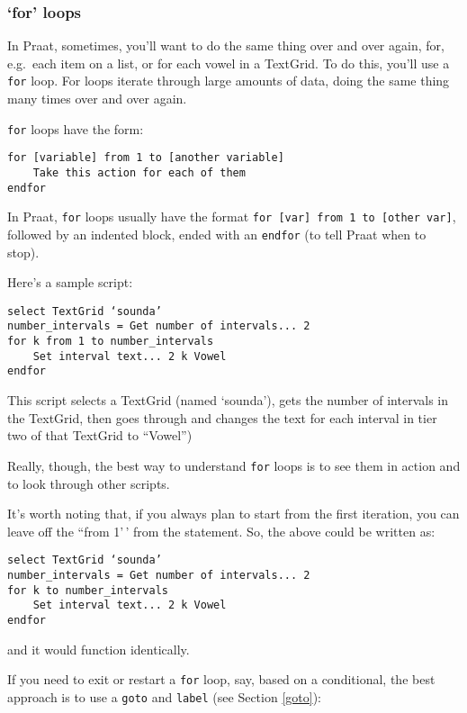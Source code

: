 \documentclass[11pt]{article}
\begin{document}
\hypertarget{for-loops}{%
\subsubsection{`for' loops}\label{for-loops}}

\label{forloops}

In Praat, sometimes, you'll want to do the same thing over and over
again, for, e.g.~each item on a list, or for each vowel in a TextGrid.
To do this, you'll use a \texttt{for} loop. For loops iterate through
large amounts of data, doing the same thing many times over and over
again.

\texttt{for} loops have the form:

\begin{verbatim}
for [variable] from 1 to [another variable]
    Take this action for each of them
endfor
\end{verbatim}

In Praat, \texttt{for} loops usually have the format
\texttt{for [var] from 1 to [other var]}, followed by an indented block,
ended with an \texttt{endfor} (to tell Praat when to stop).

Here's a sample script:

\begin{verbatim} 
select TextGrid ‘sounda’
number_intervals = Get number of intervals... 2
for k from 1 to number_intervals
    Set interval text... 2 k Vowel
endfor
\end{verbatim}

This script selects a TextGrid (named `sounda'), gets the number of
intervals in the TextGrid, then goes through and changes the text for
each interval in tier two of that TextGrid to ``Vowel'')

Really, though, the best way to understand \texttt{for} loops is to see
them in action and to look through other scripts.

It's worth noting that, if you always plan to start from the first
iteration, you can leave off the ``from 1'\,' from the statement. So,
the above could be written as:

\begin{verbatim} 
select TextGrid ‘sounda’
number_intervals = Get number of intervals... 2
for k to number_intervals
    Set interval text... 2 k Vowel
endfor
\end{verbatim}

and it would function identically.

If you need to exit or restart a \texttt{for} loop, say, based on a
conditional, the best approach is to use a \texttt{goto} and
\texttt{label} (see Section \ref{goto}):
\end{document}
